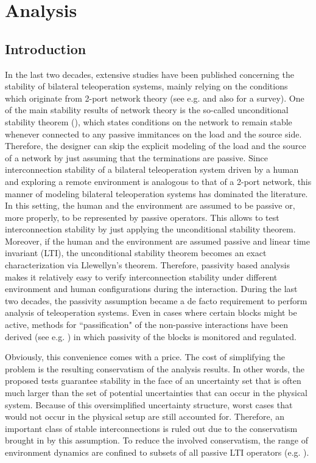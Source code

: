 \chapter{Analysis}
\label{chap:analysis}


\section{Introduction}

In the last two decades, extensive studies have been published concerning the stability of bilateral teleoperation systems, mainly relying on the conditions which originate from 2-port network theory (see e.g. \cite{lawrence,hannaford89,adamshan,andersonspong,nieslotine,yokokohjiyoshikawa} and also \cite{hokayemspong} for a survey). One of the main stability results of network theory is the so-called unconditional stability theorem (\cite{llewellyn,bolinder}), which states conditions on the network to remain stable whenever connected to any passive immitances on the load and the source side. Therefore, the designer can skip the explicit modeling of the load and the source of a network by just assuming that the terminations are passive. Since interconnection stability of a bilateral teleoperation system driven by a human and exploring a remote environment is analogous to that of a 2-port network, this manner of modeling  bilateral teleoperation systems has dominated the literature. In this setting, the human and the environment are assumed to be passive or, more properly, to be represented by passive operators. This allows to test interconnection stability by just applying the unconditional stability theorem. Moreover, if the human and the environment are assumed passive and linear time invariant (LTI), the unconditional stability theorem becomes an exact characterization via Llewellyn's theorem. Therefore, passivity based analysis makes it relatively easy to verify interconnection stability under different environment and human configurations during the interaction. During the last two decades, the passivity assumption became a de facto requirement to perform analysis of teleoperation systems. Even in cases where certain blocks might be active, methods for ``passification" of the non-passive interactions have been derived (see e.g. \cite{ryukwonhanna}) in which passivity of the blocks is monitored and regulated.

Obviously, this convenience comes with a price. The cost of simplifying the problem is the resulting conservatism of the analysis results. In other words, the proposed tests guarantee stability in the face of an uncertainty set that is often much larger than the set of potential uncertainties that can occur in the physical system. Because of this oversimplified uncertainty structure, worst cases that would not occur in the physical setup are still accounted for. Therefore, an important class of stable interconnections is ruled out due to the conservatism brought in by this assumption. To reduce the involved conservatism, the range of environment dynamics are confined to subsets of all passive LTI operators
(e.g.  \cite{adamshan2,chopark,Peer2008b,haddadizaad,willaertIJRR10}).

